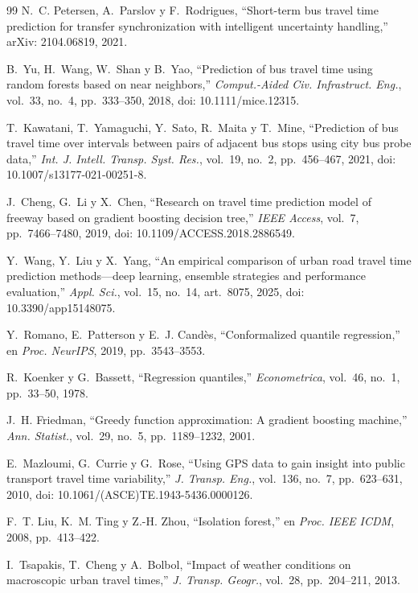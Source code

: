 \documentclass[conference,a4paper]{IEEEtran}
\begin{document}
\begin{thebibliography}{99}
N.~C. Petersen, A.~Parslov y F.~Rodrigues, ``Short-term bus travel time prediction for transfer synchronization with intelligent uncertainty handling,'' arXiv: 2104.06819, 2021.

B.~Yu, H.~Wang, W.~Shan y B.~Yao, ``Prediction of bus travel time using random forests based on near neighbors,'' \emph{Comput.-Aided Civ. Infrastruct. Eng.}, vol.~33, no.~4, pp.~333--350, 2018, doi: 10.1111/mice.12315.

T.~Kawatani, T.~Yamaguchi, Y.~Sato, R.~Maita y T.~Mine, ``Prediction of bus travel time over intervals between pairs of adjacent bus stops using city bus probe data,'' \emph{Int. J. Intell. Transp. Syst. Res.}, vol.~19, no.~2, pp.~456--467, 2021, doi: 10.1007/s13177-021-00251-8.

J.~Cheng, G.~Li y X.~Chen, ``Research on travel time prediction model of freeway based on gradient boosting decision tree,'' \emph{IEEE Access}, vol.~7, pp.~7466--7480, 2019, doi: 10.1109/ACCESS.2018.2886549.

Y.~Wang, Y.~Liu y X.~Yang, ``An empirical comparison of urban road travel time prediction methods---deep learning, ensemble strategies and performance evaluation,'' \emph{Appl. Sci.}, vol.~15, no.~14, art.~8075, 2025, doi: 10.3390/app15148075.

Y.~Romano, E.~Patterson y E.~J. Candès, ``Conformalized quantile regression,'' en \emph{Proc. NeurIPS}, 2019, pp.~3543--3553.

R.~Koenker y G.~Bassett, ``Regression quantiles,'' \emph{Econometrica}, vol.~46, no.~1, pp.~33--50, 1978.

J.~H. Friedman, ``Greedy function approximation: A gradient boosting machine,'' \emph{Ann. Statist.}, vol.~29, no.~5, pp.~1189--1232, 2001.

E.~Mazloumi, G.~Currie y G.~Rose, ``Using GPS data to gain insight into public transport travel time variability,'' \emph{J. Transp. Eng.}, vol.~136, no.~7, pp.~623--631, 2010, doi: 10.1061/(ASCE)TE.1943-5436.0000126.

F.~T. Liu, K.~M. Ting y Z.-H. Zhou, ``Isolation forest,'' en \emph{Proc. IEEE ICDM}, 2008, pp.~413--422.

I.~Tsapakis, T.~Cheng y A.~Bolbol, ``Impact of weather conditions on macroscopic urban travel times,'' \emph{J. Transp. Geogr.}, vol.~28, pp.~204--211, 2013.


\end{thebibliography}
\end{document}
